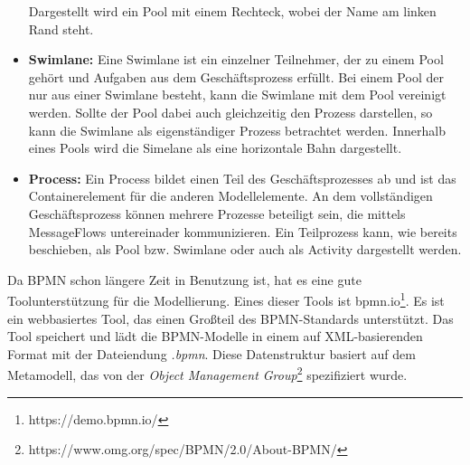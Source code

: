 \begin{itemize}
    Dargestellt wird ein Pool mit einem Rechteck, wobei der Name am linken Rand steht.
    \item \textbf{Swimlane:}
    Eine Swimlane ist ein einzelner Teilnehmer, der zu einem Pool gehört und Aufgaben aus dem Geschäftsprozess erfüllt.
    Bei einem Pool der nur aus einer Swimlane besteht, kann die Swimlane mit dem Pool vereinigt werden.
    Sollte der Pool dabei auch gleichzeitig den Prozess darstellen, so kann die Swimlane als eigenständiger Prozess betrachtet werden.
    Innerhalb eines Pools wird die Simelane als eine horizontale Bahn dargestellt.
    \item \textbf{Process:}
    Ein Process bildet einen Teil des Geschäftsprozesses ab und ist das Containerelement für die anderen Modellelemente.
    An dem vollständigen Geschäftsprozess können mehrere Prozesse beteiligt sein, die mittels MessageFlows untereinader kommunizieren.
    Ein Teilprozess kann, wie bereits beschieben, als Pool bzw. Swimlane oder auch als Activity dargestellt werden.
\end{itemize}

Da BPMN schon längere Zeit in Benutzung ist, hat es eine gute Toolunterstützung für die Modellierung.
Eines dieser Tools ist bpmn.io\footnote{https://demo.bpmn.io/}.
Es ist ein webbasiertes Tool, das einen Großteil des BPMN-Standards unterstützt.
Das Tool speichert und lädt die BPMN-Modelle in einem auf XML-basierenden Format mit der Dateiendung \emph{.bpmn}.
Diese Datenstruktur basiert auf dem Metamodell, das von der \emph{Object Management Group}\footnote{https://www.omg.org/spec/BPMN/2.0/About-BPMN/} spezifiziert wurde.


